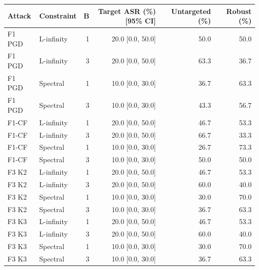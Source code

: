 \begin{tabular}{llrrrr}
\toprule
Attack & Constraint & B & Target ASR (\%) [95\% CI] & Untargeted (\%) & Robust (\%) \\
\midrule
F1 PGD & L-infinity & 1 & 20.0 [0.0, 50.0] & 50.0 & 50.0 \\
F1 PGD & L-infinity & 3 & 20.0 [0.0, 50.0] & 63.3 & 36.7 \\
F1 PGD & Spectral & 1 & 10.0 [0.0, 30.0] & 36.7 & 63.3 \\
F1 PGD & Spectral & 3 & 10.0 [0.0, 30.0] & 43.3 & 56.7 \\
F1-CF & L-infinity & 1 & 20.0 [0.0, 50.0] & 46.7 & 53.3 \\
F1-CF & L-infinity & 3 & 20.0 [0.0, 50.0] & 66.7 & 33.3 \\
F1-CF & Spectral & 1 & 10.0 [0.0, 30.0] & 26.7 & 73.3 \\
F1-CF & Spectral & 3 & 10.0 [0.0, 30.0] & 50.0 & 50.0 \\
F3 K2 & L-infinity & 1 & 20.0 [0.0, 50.0] & 46.7 & 53.3 \\
F3 K2 & L-infinity & 3 & 20.0 [0.0, 50.0] & 60.0 & 40.0 \\
F3 K2 & Spectral & 1 & 10.0 [0.0, 30.0] & 30.0 & 70.0 \\
F3 K2 & Spectral & 3 & 10.0 [0.0, 30.0] & 36.7 & 63.3 \\
F3 K3 & L-infinity & 1 & 20.0 [0.0, 50.0] & 46.7 & 53.3 \\
F3 K3 & L-infinity & 3 & 20.0 [0.0, 50.0] & 60.0 & 40.0 \\
F3 K3 & Spectral & 1 & 10.0 [0.0, 30.0] & 30.0 & 70.0 \\
F3 K3 & Spectral & 3 & 10.0 [0.0, 30.0] & 36.7 & 63.3 \\
\bottomrule
\end{tabular}
